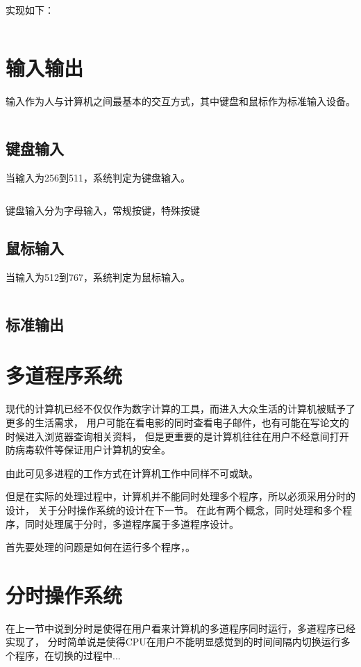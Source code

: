 实现如下：
\begin{listing}[H]
  \inputminted[tabsize=2, firstline=128, lastline=141,
  linenos=true]{c}{../ZOS/src/kernel/memory.c}
\end{listing}
\newpage
\section{输入输出}

输入作为人与计算机之间最基本的交互方式，其中键盘和鼠标作为标准输入设备。

\begin{listing}[H]
  \inputminted[tabsize=2, firstline=151, lastline=151,
  linenos=true]{c}{../ZOS/src/kernel/bootpack.c}
\end{listing}


\newpage
\subsection{键盘输入}
当输入为256到511，系统判定为键盘输入。
\begin{listing}[H]
  \inputminted[tabsize=2, firstline=161, lastline=161,
  linenos=true]{c}{../ZOS/src/kernel/bootpack.c}
\end{listing}
键盘输入分为字母输入，常规按键，特殊按键


\newpage
\subsection{鼠标输入}
当输入为512到767，系统判定为鼠标输入。
\begin{listing}[H]
  \inputminted[tabsize=2, firstline=247, lastline=247,
  linenos=true]{c}{../ZOS/src/kernel/bootpack.c}
\end{listing}

\newpage
\subsection{标准输出}

\newpage
\section{多道程序系统}

现代的计算机已经不仅仅作为数字计算的工具，而进入大众生活的计算机被赋予了更多的生活需求，
用户可能在看电影的同时查看电子邮件，也有可能在写论文的时候进入浏览器查询相关资料，
但是更重要的是计算机往往在用户不经意间打开防病毒软件等保证用户计算机的安全\cite{tanenbaum2009modern}。

由此可见多进程的工作方式在计算机工作中同样不可或缺。

但是在实际的处理过程中，计算机并不能同时处理多个程序，所以必须采用分时的设计，
关于分时操作系统的设计在下一节。
在此有两个概念，同时处理和多个程序，同时处理属于分时，多道程序属于多道程序设计。

首先要处理的问题是如何在运行多个程序，。

\newpage
\section{分时操作系统}

在上一节中说到分时是使得在用户看来计算机的多道程序同时运行，多道程序已经实现了，
分时简单说是使得CPU在用户不能明显感觉到的时间间隔内切换运行多个程序，在切换的过程中...
